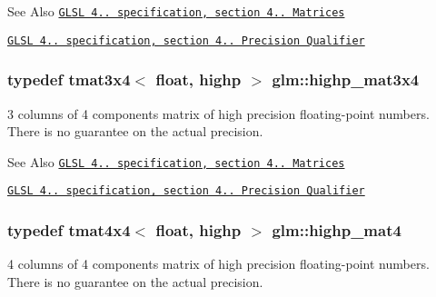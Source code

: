 \begin{DoxySeeAlso}{See Also}
\href{http://www.opengl.org/registry/doc/GLSLangSpec.4.20.8.pdf}{\tt G\-L\-S\-L 4.. specification, section 4.. Matrices} 

\href{http://www.opengl.org/registry/doc/GLSLangSpec.4.20.8.pdf}{\tt G\-L\-S\-L 4.. specification, section 4.. Precision Qualifier} 
\end{DoxySeeAlso}
\hypertarget{group__core__precision_gab51b3b8377cf9462a39a1560333a4215}{
\subsubsection[{highp\-\_\-mat3x4}]{\setlength{\rightskip}{0pt plus 5cm}typedef tmat3x4$<$ float, highp $>$ {\bf glm\-::highp\-\_\-mat3x4}}}\label{group__core__precision_gab51b3b8377cf9462a39a1560333a4215}
3 columns of 4 components matrix of high precision floating-\/point numbers. There is no guarantee on the actual precision.

\begin{DoxySeeAlso}{See Also}
\href{http://www.opengl.org/registry/doc/GLSLangSpec.4.20.8.pdf}{\tt G\-L\-S\-L 4.. specification, section 4.. Matrices} 

\href{http://www.opengl.org/registry/doc/GLSLangSpec.4.20.8.pdf}{\tt G\-L\-S\-L 4.. specification, section 4.. Precision Qualifier} 
\end{DoxySeeAlso}
\hypertarget{group__core__precision_ga26f802a535816c7357df06361e695172}{
\subsubsection[{highp\-\_\-mat4}]{\setlength{\rightskip}{0pt plus 5cm}typedef tmat4x4$<$ float, highp $>$ {\bf glm\-::highp\-\_\-mat4}}}\label{group__core__precision_ga26f802a535816c7357df06361e695172}
4 columns of 4 components matrix of high precision floating-\/point numbers. There is no guarantee on the actual precision.

